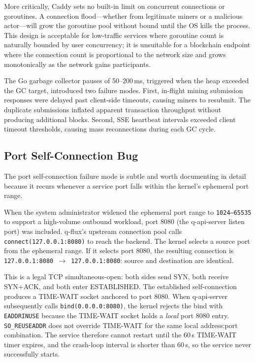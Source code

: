 \documentclass[a4paper, 11pt]{article}
\begin{document}
More critically, Caddy sets no built-in limit on concurrent connections or
goroutines.  A connection flood---whether from legitimate miners or a malicious
actor---will grow the goroutine pool without bound until the OS kills the process.
This design is acceptable for low-traffic services where goroutine count is
naturally bounded by user concurrency; it is unsuitable for a blockchain endpoint
where the connection count is proportional to the network size and grows
monotonically as the network gains participants.

The Go garbage collector pauses of 50--200\,ms, triggered when the heap exceeded
the GC target, introduced two failure modes.  First, in-flight mining submission
responses were delayed past client-side timeouts, causing miners to resubmit.
The duplicate submissions inflated apparent transaction throughput without
producing additional blocks.  Second, SSE heartbeat intervals exceeded client
timeout thresholds, causing mass reconnections during each GC cycle.

\subsection{Port Self-Connection Bug}

The port self-connection failure mode is subtle and worth documenting in detail
because it recurs whenever a service port falls within the kernel's ephemeral
port range.

When the system administrator widened the ephemeral port range to
\texttt{1024--65535} to support a high-volume outbound workload, port 8080 (the
q-api-server listen port) was included.  q-flux's upstream connection pool
calls \texttt{connect(127.0.0.1:8080)} to reach the backend.  The kernel selects
a source port from the ephemeral range.  If it selects port 8080, the resulting
connection is \texttt{127.0.0.1:8080~$\to$~127.0.0.1:8080}: source and
destination are identical.

This is a legal TCP simultaneous-open: both sides send SYN, both receive SYN+ACK,
and both enter ESTABLISHED.  The established self-connection produces a TIME-WAIT
socket anchored to port 8080.  When q-api-server subsequently calls
\texttt{bind(0.0.0.0:8080)}, the kernel rejects the bind with \texttt{EADDRINUSE}
because the TIME-WAIT socket holds a \emph{local} port 8080 entry.
\texttt{SO\_REUSEADDR} does not override TIME-WAIT for the same local address:port
combination.  The service therefore cannot restart until the 60\,s TIME-WAIT
timer expires, and the crash-loop interval is shorter than 60\,s, so the service
never successfully starts.
\end{document}
